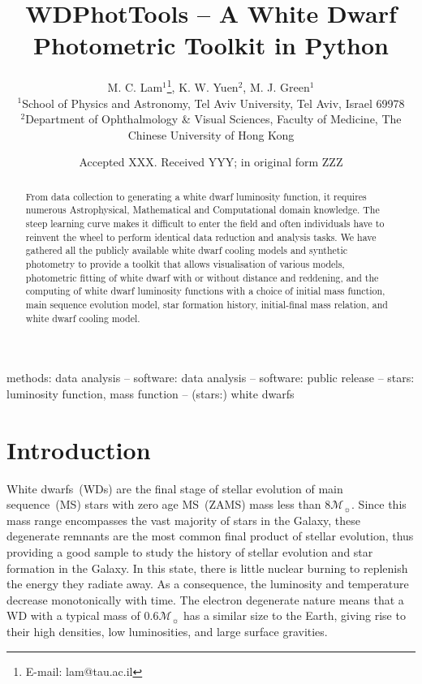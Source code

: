 \documentclass[fleqn,usenatbib]{rasti}
\title[WD Photometric Toolkit]{WDPhotTools -- A White Dwarf Photometric Toolkit in Python}
\author[M. C. Lam et al.]{
M. C. Lam$^{1}$\thanks{E-mail: lam@tau.ac.il},
K. W. Yuen$^{2}$,
M. J. Green$^{1}$\\
$^{1}$School of Physics and Astronomy, Tel Aviv University, Tel Aviv, Israel 69978\\
$^{2}$Department of Ophthalmology \& Visual Sciences, Faculty of Medicine, The Chinese University of Hong Kong
}
\date{Accepted XXX. Received YYY; in original form ZZZ}
\newcommand{\msun}{\mathcal{M}_{\sun}}
\begin{document}
\label{firstpage}
\pagerange{\pageref{firstpage}--\pageref{lastpage}}
\maketitle

\begin{abstract}
From data collection to generating a white dwarf luminosity function, it
requires numerous Astrophysical, Mathematical and Computational domain
knowledge. The steep learning curve makes it difficult to enter the field and
often individuals have to reinvent the wheel to perform identical data reduction
and analysis tasks. We have gathered all the publicly available white dwarf
cooling models and synthetic photometry to provide a toolkit that allows
visualisation of various models, photometric fitting of white dwarf with or
without distance and reddening, and the computing of white dwarf luminosity
functions with a choice of initial mass function, main sequence evolution model,
star formation history, initial-final mass relation, and white dwarf cooling
model.

\end{abstract}

\begin{keywords}
methods: data analysis -- software: data analysis -- software: public release -- stars: luminosity function, mass function -- (stars:) white dwarfs
\end{keywords}


\section{Introduction}
White dwarfs~(WDs) are the final stage of stellar evolution of main
sequence~(MS) stars with zero age MS~(ZAMS) mass less than $8\msun$. Since this
mass range encompasses the vast majority of stars in the Galaxy, these
degenerate remnants are the most common final product of stellar evolution,
thus providing a good sample to study the history of stellar evolution and star
formation in the Galaxy. In this state, there is little nuclear burning to
replenish the energy they radiate away. As a consequence, the luminosity and
temperature decrease monotonically with time. The electron degenerate nature
means that a WD with a typical mass of $0.6\mathcal{M}_{\sun}$ has a similar
size to the Earth, giving rise to their high densities, low luminosities, and
large surface gravities.
\end{document}
